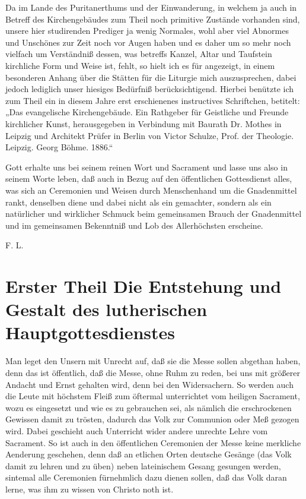 Da im Lande des Puritanerthums und der Einwanderung, in welchem ja auch in Betreff des Kirchengebäudes zum Theil noch primitive Zustände vorhanden sind, unsere hier studirenden Prediger ja wenig Normales, wohl aber viel Abnormes und Unschönes zur Zeit noch vor Augen haben und es daher um so mehr noch vielfach um Verständniß dessen, was betreffs Kanzel, Altar und Taufstein kirchliche Form und Weise ist, fehlt, so hielt ich es für angezeigt, in einem besonderen Anhang über die Stätten für die Liturgie mich auszusprechen, dabei jedoch lediglich unser hiesiges Bedürfniß berücksichtigend. Hierbei benützte ich zum Theil ein in diesem Jahre erst erschienenes instructives Schriftchen, betitelt: „Das evangelische Kirchengebäude. Ein Rathgeber für Geistliche und Freunde kirchlicher Kunst, herausgegeben in Verbindung mit Baurath Dr. Mothes in Leipzig und Architekt Prüfer in Berlin von Victor Schulze, Prof. der Theologie. Leipzig. Georg Böhme. 1886.“

Gott erhalte uns bei seinem reinen Wort und Sacrament und lasse uns also in seinem Worte leben, daß auch in Bezug auf den öffentlichen Gottesdienst alles, was sich an Ceremonien und Weisen durch Menschenhand um die Gnadenmittel rankt, denselben diene und dabei nicht als ein gemachter, sondern als ein natürlicher und wirklicher Schmuck beim gemeinsamen Brauch der Gnadenmittel und im gemeinsamen Bekenntniß und Lob des Allerhöchsten erscheine.

\begin{unterschrift}
F. L.
\end{unterschrift}

\tableofcontents
{}
\mainmatter

\part[Erster Theil]{Erster Theil Die Entstehung und Gestalt des lutherischen Hauptgottesdienstes}

Man leget den Unsern mit Unrecht auf, daß sie die Messe sollen abgethan haben, denn das ist öffentlich, daß die Messe, ohne Ruhm zu reden, bei uns mit größerer Andacht und Ernst gehalten wird, denn bei den Widersachern. So werden auch die Leute mit höchstem Fleiß zum öftermal unterrichtet vom heiligen Sacrament, wozu es eingesetzt und wie es zu gebrauchen sei, als nämlich die erschrockenen Gewissen damit zu trösten, dadurch das Volk zur Communion oder Meß gezogen wird. Dabei geschieht auch Unterricht wider andere unrechte Lehre vom Sacrament. So ist auch in den öffentlichen Ceremonien der Messe keine merkliche Aenderung geschehen, denn daß an etlichen Orten deutsche Gesänge (das Volk damit zu lehren und zu üben) neben lateinischem Gesang gesungen werden, sintemal alle Ceremonien fürnehmlich dazu dienen sollen, daß das Volk daran lerne, was ihm zu wissen von Christo noth ist.

